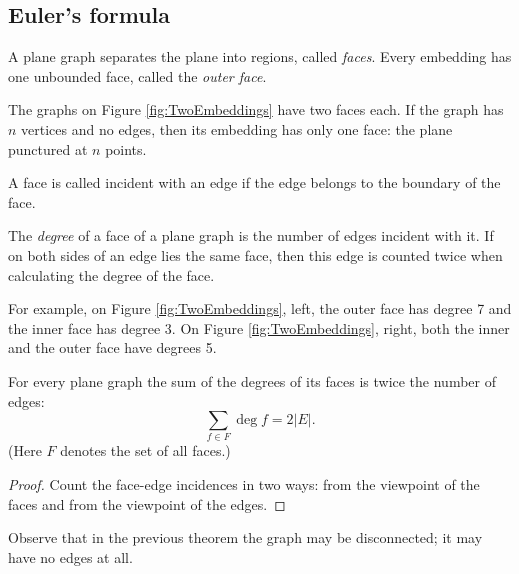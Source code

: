 \begin{page}

\subsection{Euler's formula}
A plane graph separates the plane into regions, called \emph{faces}.
Every embedding has one unbounded face, called the \emph{outer face}.

The graphs on Figure \ref{fig:TwoEmbeddings} have two faces each.
If the graph has $n$ vertices and no edges, then its embedding has only one face: the plane punctured at $n$ points.

A face is called incident with an edge if the edge belongs to the boundary of the face.

\end{page}

\begin{page}

\begin{dfn}
The \emph{degree} of a face of a plane graph is the number of edges incident with it.
If on both sides of an edge lies the same face, then this edge is counted twice when calculating the degree of the face.
\end{dfn}

\end{page}

\begin{page}

For example, on Figure \ref{fig:TwoEmbeddings}, left, the outer face has degree 7 and the inner face has degree 3.
On Figure \ref{fig:TwoEmbeddings}, right, both the inner and the outer face have degrees 5.


\end{page}

\begin{page}

\begin{thm}
\label{thm:DualHandshake}
For every plane graph the sum of the degrees of its faces is twice the number of edges:
\[
\sum_{f \in F} \deg f = 2 |E|.
\]
(Here $F$ denotes the set of all faces.)
\end{thm}

\end{page}

\begin{page}

\begin{proof}
Count the face-edge incidences in two ways:
from the viewpoint of the faces and from the viewpoint of the edges.
\end{proof}
Observe that in the previous theorem the graph may be disconnected; it may have no edges at all.


\end{page}

